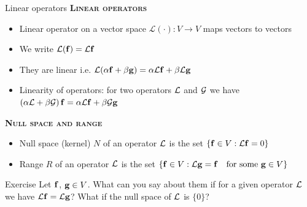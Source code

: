 \begin{frame}{Linear operators}	
	\textbf{\textsc{Linear operators}}
	\begin{itemize}
		\item Linear operator on a vector space $ \mathcal{L} (\cdot)  : V \to V $ maps vectors to vectors
		\item We write $ \mathcal{L}(\mathbf{f}) = \mathcal{L} \mathbf{f} $
		\item They are linear i.e. $ \mathcal{L}(\alpha \mathbf{f} + \beta \mathbf{g}) 
		= \alpha \mathcal{L} \mathbf{f} + \beta \mathcal{L} \mathbf{g} $
		\item Linearity of operators: for two operators $ \mathcal{L} $ and $ \mathcal{G} $ we have $ \left( \alpha \mathcal{L} + \beta \mathcal{G} \right) \mathbf{f} = \alpha \mathcal{L} \mathbf{f} + \beta \mathcal{G} \mathbf{g} $
	\end{itemize}
	\textbf{\textsc{Null space and range}}
	\begin{itemize}
		\item \alert{Null space} (kernel) $ N $ of an operator $ \mathcal{L} $ is the set $ \{ \mathbf{f} \in V : \mathcal{L} \mathbf{f} = 0 \} $
		\item \alert{Range} $ R $ of an operator $ \mathcal{L} $ is the set $ \{ \mathbf{f} \in V : \mathcal{L} \mathbf{g} = \mathbf{f}\quad \text{for some $ \mathbf{g} \in V $} \} $
	\end{itemize}
\end{frame}


\begin{frame}{Exercise \exercisen}
	Let $ \mathbf{f} $, $ \mathbf{g} \in V $. What can you say about them if for a given operator $ \mathcal{L} $ we have $ \mathcal{L} \mathbf{f} = \mathcal{L} \mathbf{g} $? What if the null space of $ \mathcal{L} $ is $ \{ 0 \} $?
\end{frame}




